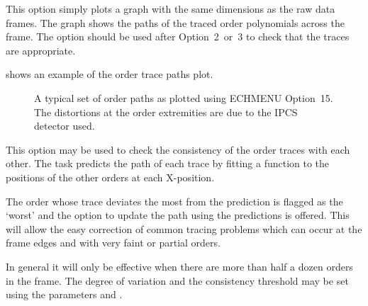 
This option simply plots a graph with the same dimensions as the raw data
frames. The graph shows the paths of the traced order polynomials across
the frame. The option should be used after Option~2~or~3 to check that the
traces are appropriate.

shows an example of the order trace paths plot.

\begin{figure}
\begin{center}
{\leavevmode\epsfysize=136mm}

\parbox{140mm}{
\caption{A typical set of order paths as plotted using ECHMENU Option~15.
The distortions at the order extremities are due to the IPCS detector used.}
\label{fi_order}
}
\end{center}
\end{figure}



This option may be used to check the consistency of the order traces with
each other. The task predicts the path of each trace by fitting a function
to the positions of the other orders at each X-position.

The order whose trace deviates the most from the prediction is flagged as
the `worst' and the option to update the path using the predictions is
offered. This will allow the easy correction of common tracing problems
which can occur at the frame edges and with very faint or partial orders.

In general it will only be effective when there are more than half a dozen
orders in the frame. The degree of variation and the consistency threshold
may be set using the parameters 
and \@.


